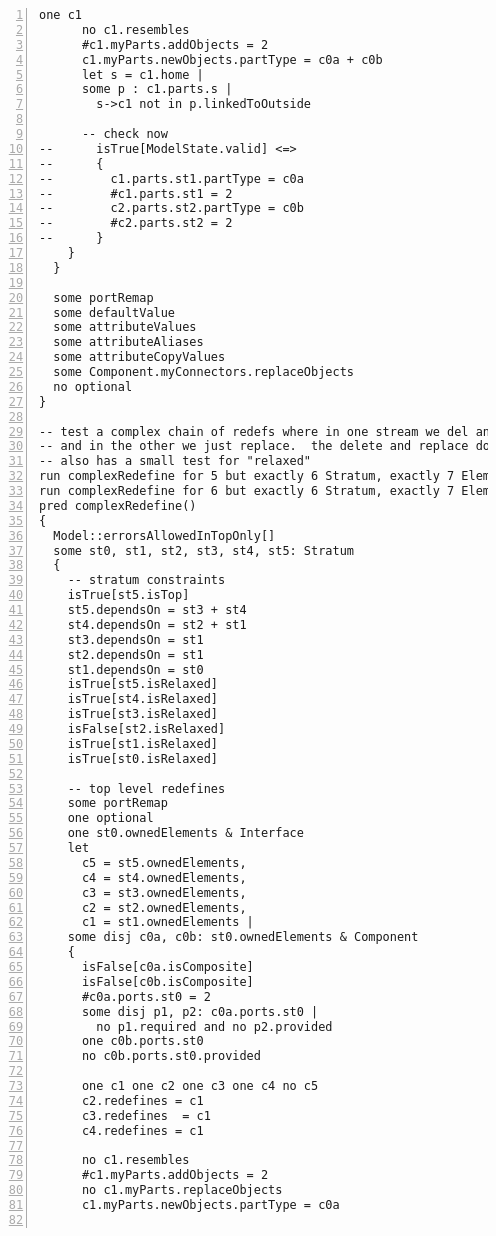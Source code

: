 \begin{lstlisting}[caption={unittests\_redefinition.als}, numbers=left]
      one c1
      no c1.resembles
      #c1.myParts.addObjects = 2
      c1.myParts.newObjects.partType = c0a + c0b
      let s = c1.home |
      some p : c1.parts.s |
        s->c1 not in p.linkedToOutside
      
      -- check now
--      isTrue[ModelState.valid] <=>
--      {
--        c1.parts.st1.partType = c0a
--        #c1.parts.st1 = 2
--        c2.parts.st2.partType = c0b
--        #c2.parts.st2 = 2
--      }
    }
  }

  some portRemap
  some defaultValue
  some attributeValues
  some attributeAliases
  some attributeCopyValues
  some Component.myConnectors.replaceObjects
  no optional
}

-- test a complex chain of redefs where in one stream we del and then add on top of that
-- and in the other we just replace.  the delete and replace don't work on the same partname
-- also has a small test for "relaxed"
run complexRedefine for 5 but exactly 6 Stratum, exactly 7 Element, exactly 1 Interface, exactly 6 Component, exactly 6 structure/Attributes/Deltas, exactly 6 structure/Ports/Deltas, exactly 3 Attribute, exactly 1 AttributeType, exactly 3 AttributeValue, 8 ConnectorEnd
run complexRedefine for 6 but exactly 6 Stratum, exactly 7 Element, exactly 1 Interface, exactly 6 Component, 10 ConnectorEnd
pred complexRedefine()
{
  Model::errorsAllowedInTopOnly[]
  some st0, st1, st2, st3, st4, st5: Stratum
  {
    -- stratum constraints
    isTrue[st5.isTop]
    st5.dependsOn = st3 + st4
    st4.dependsOn = st2 + st1
    st3.dependsOn = st1
    st2.dependsOn = st1
    st1.dependsOn = st0
    isTrue[st5.isRelaxed]
    isTrue[st4.isRelaxed]
    isTrue[st3.isRelaxed]
    isFalse[st2.isRelaxed]
    isTrue[st1.isRelaxed]
    isTrue[st0.isRelaxed]

    -- top level redefines
    some portRemap
    one optional
    one st0.ownedElements & Interface
    let
      c5 = st5.ownedElements,
      c4 = st4.ownedElements,
      c3 = st3.ownedElements,
      c2 = st2.ownedElements,
      c1 = st1.ownedElements |
    some disj c0a, c0b: st0.ownedElements & Component
    {
      isFalse[c0a.isComposite]
      isFalse[c0b.isComposite]
      #c0a.ports.st0 = 2
      some disj p1, p2: c0a.ports.st0 |
        no p1.required and no p2.provided
      one c0b.ports.st0
      no c0b.ports.st0.provided
      
      one c1 one c2 one c3 one c4 no c5
      c2.redefines = c1
      c3.redefines  = c1
      c4.redefines = c1
  
      no c1.resembles
      #c1.myParts.addObjects = 2
      no c1.myParts.replaceObjects
      c1.myParts.newObjects.partType = c0a
      

\end{lstlisting}

